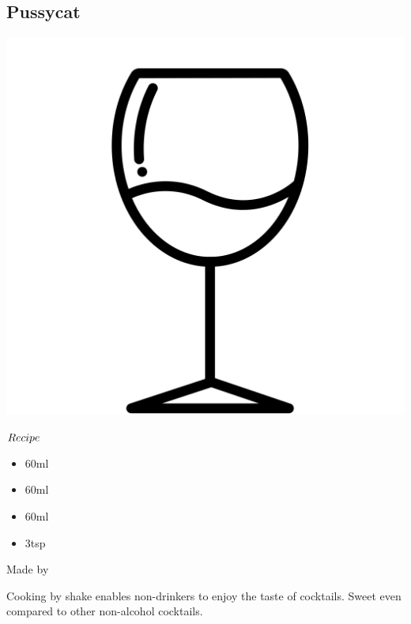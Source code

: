 \subsection{Pussycat}
\vspace{-7.2mm}
\hspace{29mm}
\includegraphics[scale=.03]{cocktail_glass_sour.png}
\vspace{2.5mm}
\begin{itembox}[l]{\boldmath $Recipe$}
\begin{itemize}
\setlength{\parskip}{0cm}
\setlength{\itemsep}{0cm}
\item \oj 60ml
\item \pj 60ml
\item \gj 60ml
\item \gs 3tsp
\end{itemize}
\vspace{-4mm}
Made by \shake
\end{itembox}
Cooking by shake enables non-drinkers to enjoy the taste of cocktails. Sweet even compared to other non-alcohol cocktails.
